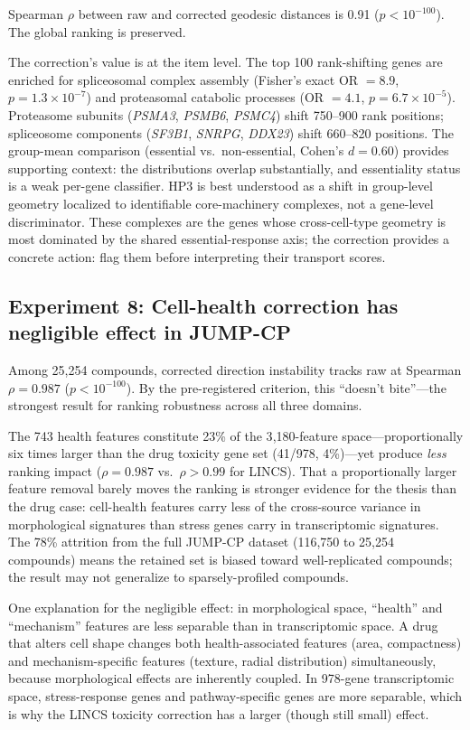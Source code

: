 \documentclass[11pt]{article}
\begin{document}
Spearman $\rho$ between raw and corrected geodesic distances is 0.91
($p < 10^{-100}$). The global ranking is preserved.

The correction's value is at the item level. The top 100 rank-shifting
genes are enriched for spliceosomal complex assembly (Fisher's exact
OR $= 8.9$, $p = 1.3 \times 10^{-7}$) and proteasomal catabolic
processes (OR $= 4.1$, $p = 6.7 \times 10^{-5}$). Proteasome subunits
(\emph{PSMA3}, \emph{PSMB6}, \emph{PSMC4}) shift 750--900 rank positions;
spliceosome components (\emph{SF3B1}, \emph{SNRPG}, \emph{DDX23}) shift
660--820 positions. The group-mean comparison (essential vs.\ non-essential,
Cohen's $d = 0.60$) provides supporting context: the distributions overlap
substantially, and essentiality status is a weak per-gene classifier.
HP3 is best understood as a shift in group-level geometry localized to
identifiable core-machinery complexes, not a gene-level discriminator.
These complexes are the genes whose cross-cell-type geometry is most
dominated by the shared essential-response axis; the correction provides a
concrete action: flag them before interpreting their transport scores.

\subsection{Experiment 8: Cell-health correction has negligible
effect in JUMP-CP}

Among 25{,}254 compounds, corrected direction instability tracks raw
at Spearman $\rho = 0.987$ ($p < 10^{-100}$). By the pre-registered
criterion, this ``doesn't bite''---the strongest result for ranking
robustness across all three domains.

The 743 health features constitute 23\% of the 3{,}180-feature
space---proportionally six times larger than the drug toxicity gene set
(41/978, 4\%)---yet produce \emph{less} ranking impact ($\rho = 0.987$
vs.\ $\rho > 0.99$ for LINCS). That a proportionally larger feature
removal barely moves the ranking is stronger evidence for the thesis than
the drug case: cell-health features carry less of the cross-source
variance in morphological signatures than stress genes carry in
transcriptomic signatures. The 78\% attrition from the full JUMP-CP
dataset (116{,}750 to 25{,}254 compounds) means the retained set is
biased toward well-replicated compounds; the result may not generalize
to sparsely-profiled compounds.

One explanation for the negligible effect: in morphological space,
``health'' and ``mechanism'' features are less separable than in
transcriptomic space. A drug that alters cell shape changes both
health-associated features (area, compactness) and mechanism-specific
features (texture, radial distribution) simultaneously, because
morphological effects are inherently coupled. In 978-gene transcriptomic
space, stress-response genes and pathway-specific genes are more
separable, which is why the LINCS toxicity correction has a larger
(though still small) effect.
\end{document}
